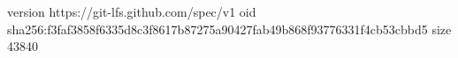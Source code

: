 version https://git-lfs.github.com/spec/v1
oid sha256:f3faf3858f6335d8c3f8617b87275a90427fab49b868f93776331f4cb53cbbd5
size 43840
